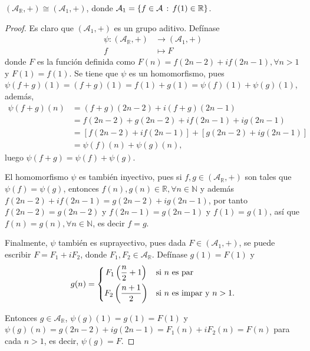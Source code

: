 \begin{lemma}\label{prop:iso4}
$(\mathcal{A}_{\mathbb{R}},+) \cong (\mathcal{A}_1,+)$, donde $\mathcal{A}_1 = \{ f \in \mathcal{A} \, : \, f(1) \in \mathbb{R} \}$.
\end{lemma}
\begin{proof}
Es claro que $(\mathcal{A}_1,+)$ es un grupo aditivo. Defínase
\begin{align*}
    \psi : (\mathcal{A}_{\mathbb{R}},+) & \longrightarrow (\mathcal{A}_1,+) \\
    f & \longmapsto F
\end{align*}
donde $F$ es la función definida como $F(n)=f(2n-2)+i f(2n-1), \forall n>1$ y $F(1)=f(1)$. Se tiene que $\psi$ es un homomorfismo, pues $\psi(f+g)(1)=(f+g)(1)=f(1)+g(1)=\psi(f)(1)+\psi(g)(1)$, además,
\begin{align*}
    \psi(f+g)(n) &= (f+g)(2n-2)+i (f+g)(2n-1) \\
                 &= f(2n-2)+g(2n-2)+i f(2n-1)+i g(2n-1) \\
                 &= [f(2n-2)+i f(2n-1)] + [g(2n-2)+i g(2n-1)] \\
                 &= \psi(f)(n)+\psi(g)(n),
\end{align*}
luego $\psi(f+g)=\psi(f)+\psi(g)$.
\bigskip

El homomorfismo $\psi$ es también inyectivo, pues si $f,g \in (\mathcal{A}_{\mathbb{R}},+)$ son tales que $\psi(f)=\psi(g)$, entonces $f(n),g(n) \in \mathbb{R}, \forall n \in \mathbb{N}$ y además $f(2n-2)+i f(2n-1)=g(2n-2)+i g(2n-1)$, por tanto $f(2n-2)=g(2n-2)$ y $f(2n-1)=g(2n-1)$ y $f(1)=g(1)$, así que $f(n)=g(n), \forall n \in \mathbb{N}$, es decir $f=g$.
\bigskip

Finalmente, $\psi$ también es suprayectivo, pues dada $F \in (\mathcal{A}_1,+)$, se puede escribir $F=F_1+i F_2$, donde $F_1,F_2 \in \mathcal{A}_{\mathbb{R}}$. Defínase $g(1)=F(1)$ y 
{\everymath{\displaystyle}
    \begin{equation*}
        g(n) = \begin{dcases}
            \hfil F_1 \left( \frac{n}{2}+1 \right) & \text{si } n \text{ es par } \\
            \hfil F_2 \left( \frac{n+1}{2} \right) & \text{si } n \text{ es impar y } n>1.
        \end{dcases}
    \end{equation*}
}

Entonces $g \in \mathcal{A}_{\mathbb{R}}$, $\psi(g)(1)=g(1)=F(1)$ y $\psi(g)(n)=g(2n-2)+i g(2n-1)=F_1(n)+i F_2(n)=F(n)$ para cada $n>1$, es decir, $\psi(g)=F$.
\end{proof}


